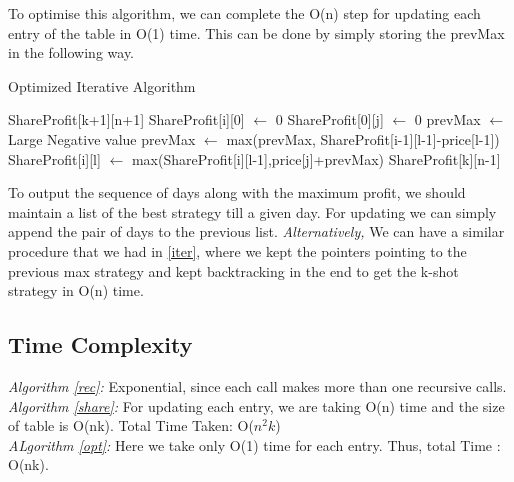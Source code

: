 \documentclass{article}
\begin{document}
To optimise this algorithm, we can complete the O(n) step for updating each entry of the table in O(1) time. This can be done by simply storing the prevMax in the following way.
\begin{algorithm}[h!]
\caption{Optimized Iterative Algorithm}
\label{opt}
\begin{algorithmic}[1]
\State ShareProfit[k+1][n+1] 
\State ShareProfit[i][0] $\gets$ 0
\EndFor
{}
\State ShareProfit[0][j] $\gets$ 0
\EndFor
{}
\State prevMax $\gets$ Large Negative value
\State prevMax $\gets$ max(prevMax, ShareProfit[i-1][l-1]-price[l-1]) 
\State ShareProfit[i][l] $\gets$ max(ShareProfit[i][l-1],price[j]+prevMax)
\EndFor
\EndFor
\State \Return ShareProfit[k][n-1]
\EndProcedure
\end{algorithmic}
\end{algorithm}

To output the sequence of days along with the maximum profit, we should maintain a list of the best strategy till a given day. For updating we can simply append the pair of days to the previous list.
\emph{Alternatively,} We can have a similar procedure that we had in \ref{iter}, where we kept the pointers pointing to the previous max strategy and kept backtracking in the end to get the k-shot strategy in O(n) time.

\subsection{Time Complexity}
\emph{Algorithm \ref{rec}: } Exponential, since each call makes more than one recursive calls.\\
\emph{Algorithm \ref{share}: } For updating each entry, we are taking O(n) time and the size of table is O(nk). Total Time Taken: O($n^2k$)\\
\emph{ALgorithm \ref{opt}: } Here we take only O(1) time for each entry. Thus, total Time : O(nk).
\end{document}
